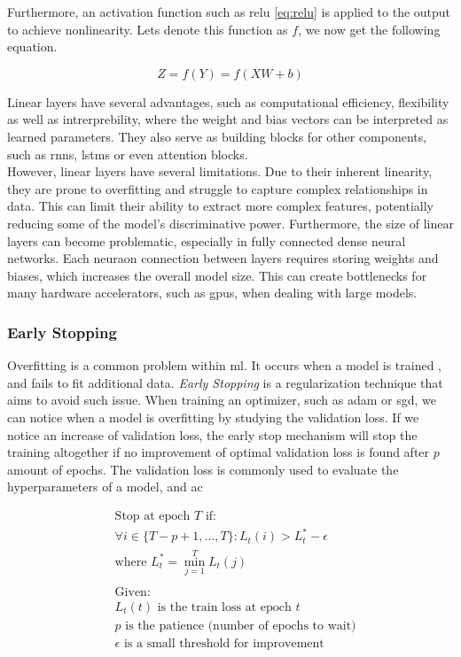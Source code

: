 Furthermore, an activation function such as \gls{relu} \ref{eq:relu} is applied to the output to achieve nonlinearity.
Lets denote this function as $f$, we now get the following equation.

\begin{equation}
    Z = f(Y) = f(XW+b)
\end{equation}

Linear layers have several advantages, such as computational efficiency, flexibility as well as intrerprebility, where the weight and bias vectors can be interpreted as learned parameters. They also serve as building blocks for other components, such as \acrshort{rnn}s, \acrshort{lstm}s or even attention blocks. \\ 

However, linear layers have several limitations. Due to their inherent linearity, they are prone to overfitting and struggle to capture complex relationships in data. This can limit their ability to extract more complex features, potentially reducing some of the model's discriminative power. Furthermore, the size of linear layers can become problematic, especially in fully connected dense neural networks. Each neuraon connection between layers requires storing weights and biases, which increases the overall model size. This can create bottlenecks for many hardware accelerators, such as \acrshort{gpu}s, when dealing with large models.

\subsubsection{Early Stopping}

Overfitting is a common problem within \acrlong{ml}. It occurs when a model is trained , and fails to fit additional data. \textit{Early Stopping} is a regularization technique that aims to avoid such issue. When training an optimizer, such as \acrshort{adam} or \acrshort{sgd}, we can notice when a model is overfitting by studying the validation loss. If we notice an increase of validation loss, the early stop mechanism will stop the training altogether if no improvement of optimal validation loss is found after $p$ amount of epochs. The validation loss is commonly used to evaluate the hyperparameters of a model, and ac 


\begin{align*}
&\text{Stop at epoch } T \text{ if:} \\
&\forall i \in \{T-p+1, ..., T\}: L_t(i) > L_t^* - \epsilon \\
&\text{where } L_t^* = \min_{j=1}^{T} L_t(j) \\
\\
&\text{Given:} \\
&L_t(t) \text{ is the train loss at epoch } t \\
&p \text{ is the patience (number of epochs to wait)} \\
&\epsilon \text{ is a small threshold for improvement}
\end{align*}

